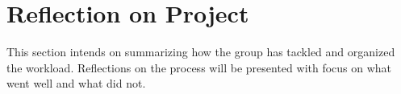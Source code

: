 \section{Reflection on Project}
This section intends on summarizing how the group has tackled and organized the workload. Reflections on the process will be presented with focus on what went well and what did not. 




